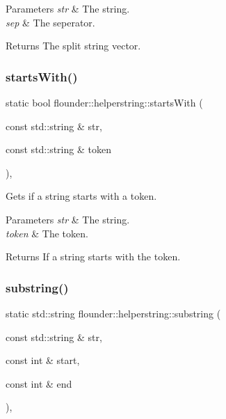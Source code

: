 \begin{DoxyParams}{Parameters}
{\em str} & The string. \\
\hline
{\em sep} & The seperator. \\
\hline
\end{DoxyParams}
\begin{DoxyReturn}{Returns}
The split string vector. 
\end{DoxyReturn}
\mbox{\label{classflounder_1_1helperstring_a842ad27a3dae27fc333ec696775db292}} 
\subsubsection{\texorpdfstring{starts\+With()}{startsWith()}}
{\footnotesize\ttfamily static bool flounder\+::helperstring\+::starts\+With (\begin{DoxyParamCaption}\item[{const std\+::string \&}]{str,  }\item[{const std\+::string \&}]{token }\end{DoxyParamCaption})\hspace{0.3cm}{\ttfamily [inline]}, {\ttfamily [static]}}



Gets if a string starts with a token. 


\begin{DoxyParams}{Parameters}
{\em str} & The string. \\
\hline
{\em token} & The token. \\
\hline
\end{DoxyParams}
\begin{DoxyReturn}{Returns}
If a string starts with the token. 
\end{DoxyReturn}
\mbox{\label{classflounder_1_1helperstring_a56efb1e2a2153b52a537c27749eeb608}} 
\subsubsection{\texorpdfstring{substring()}{substring()}}
{\footnotesize\ttfamily static std\+::string flounder\+::helperstring\+::substring (\begin{DoxyParamCaption}\item[{const std\+::string \&}]{str,  }\item[{const int \&}]{start,  }\item[{const int \&}]{end }\end{DoxyParamCaption})\hspace{0.3cm}{\ttfamily [inline]}, {\ttfamily [static]}}



